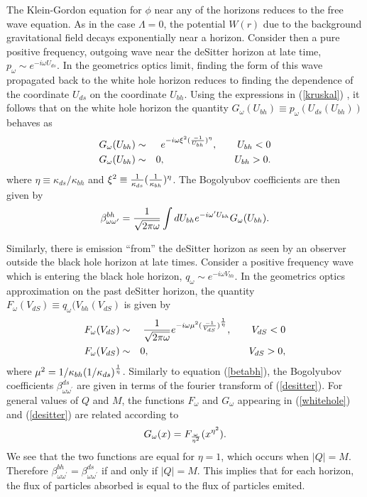 \documentclass[12pt]{article}
\newcommand{\be}{\begin{equation}}
\newcommand{\ee}{\end{equation}}
\newcommand{\p}{\partial}
\def\bena{\begin{eqnarray}}
\def\eena{\end{eqnarray}}
\def\p{p_{\omega}}
\def\q{q_{\omega}}
\def\ubh{U_{bh}}
\def\uds{U_{ds}}
\def\kbh{\kappa_{bh}}
\def\kds{\kappa_{ds}}
\def\pw{p_\omega}
\def\bwwp{\beta_{\omega\omega^\prime}}
\def\bwwpbh{\bwwp^{bh}}
\def\bwwpds{\beta_{\omega\omega^\prime}^{ds}}
\begin{document}
The Klein-Gordon equation for $\phi$ near any of the horizons reduces to
the free wave equation.  As in the case $\Lambda=0$,
the potential $W(r)$ due to the background gravitational field decays
exponentially near a horizon.  Consider then
a pure positive frequency, outgoing wave near the deSitter horizon
at late  time, $\p\sim e^{-i\omega \uds}$. In the geometrics optics
limit, finding the form of this wave
propagated back to the white hole horizon reduces to finding the
dependence of the coordinate $\uds$ on the coordinate $\ubh$.
Using the expressions in (\ref{kruskal}) , it follows that on the white
hole horizon
the quantity $G_{\omega}(\ubh )\equiv \pw (\uds (\ubh ))$ behaves as
%
\bena\label{whitehole}
G_{\omega}(\ubh )&\sim&
e^{-i\omega \xi ^2 ({-1\over \ubh})^{\eta}} ,\qquad
\ubh <0\\
G_{\omega}(\ubh )&\sim &0, \qquad\qquad\qquad\quad \ubh >0 .
\eena
%
where $\eta \equiv \kds /\kbh$ and $\xi ^2 \equiv {1\over \kds }
({1\over \kbh })^{\eta} $.
The Bogolyubov coefficients are then given by
\be\label{betabh}
\bwwpbh  = {1\over  \sqrt{2\pi\omega}}
\int d\ubh e^{-i\omega^\prime \ubh} G_{\omega} (\ubh )  .\ee
%

Similarly, there is emission ``from'' the deSitter horizon as seen
by an observer outside the black hole horizon at late times.  Consider
a positive frequency wave which is entering the black hole horizon, $\q
\sim e^{-i\omega
V_{bh}}$. In the geometrics optics approximation on the past deSitter
horizon, the
quantity $F_{\omega}(V_{dS}) \equiv \q (V_{bh} (V_{dS}) $ is given by
%
\bena\label{desitter}
F_{\omega}(V_{dS}) & \sim & {1\over \sqrt{2\pi \omega}}
e^{-i\omega\mu ^2 ({-1\over V_{dS}})^{{1\over \eta}}},\qquad  V_{dS} < 0\\
F_{\omega}(V_{dS}) & \sim & 0, \qquad\qquad\qquad\qquad\qquad V_{dS} >0,
\eena
%
where $\mu ^2 =1/\kbh (1/\kds )^{{1\over \eta}}$.
Similarly to equation (\ref{betabh}), the Bogolyubov coefficients $\bwwpds$
are given in terms
of the fourier transform  of (\ref{desitter}).
For general values of $Q$ and $M$, the functions $F_\omega$ and $G_\omega$
appearing in (\ref{whitehole}) and (\ref{desitter}) are related according to
%
\be\label{relation}
G_{\omega}(x) =F_{{\omega\over\eta ^2}}
(x^{\eta ^2}).  \ee
%
We see that the two functions are equal for
$\eta =1$, which occurs when $|Q|=M$.  Therefore
$\bwwpbh =\bwwpds$ if and only if $|Q|=M$.
This implies that for each horizon, the flux of particles absorbed is equal
to the
flux of particles emited.
\end{document}

